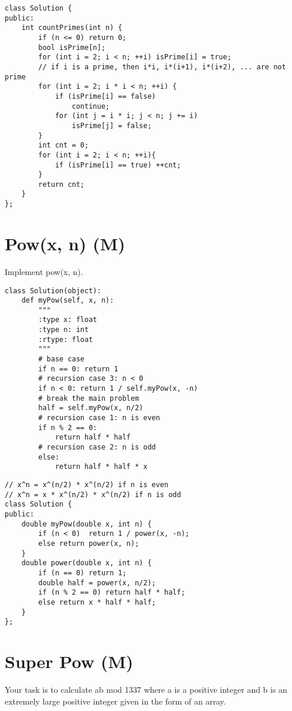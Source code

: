 \begin{lstlisting}
class Solution {
public:
    int countPrimes(int n) {
        if (n <= 0) return 0;
        bool isPrime[n];
        for (int i = 2; i < n; ++i) isPrime[i] = true;
        // if i is a prime, then i*i, i*(i+1), i*(i+2), ... are not prime
        for (int i = 2; i * i < n; ++i) {
            if (isPrime[i] == false)    
                continue;
            for (int j = i * i; j < n; j += i)  
                isPrime[j] = false;
        }
        int cnt = 0;
        for (int i = 2; i < n; ++i){
            if (isPrime[i] == true) ++cnt;
        }
        return cnt;
    }
};
\end{lstlisting}


\section{Pow(x, n) (M)}
Implement pow(x, n). \\

\begin{lstlisting}
class Solution(object):
    def myPow(self, x, n):
        """
        :type x: float
        :type n: int
        :rtype: float
        """
        # base case
        if n == 0: return 1
        # recursion case 3: n < 0
        if n < 0: return 1 / self.myPow(x, -n)   
        # break the main problem
        half = self.myPow(x, n/2)
        # recursion case 1: n is even
        if n % 2 == 0:
            return half * half
        # recursion case 2: n is odd
        else:
            return half * half * x
\end{lstlisting}

\begin{lstlisting}
// x^n = x^(n/2) * x^(n/2) if n is even
// x^n = x * x^(n/2) * x^(n/2) if n is odd
class Solution {
public:
    double myPow(double x, int n) {
        if (n < 0)  return 1 / power(x, -n);
        else return power(x, n);
    }
    double power(double x, int n) {
        if (n == 0) return 1;
        double half = power(x, n/2);
        if (n % 2 == 0) return half * half;
        else return x * half * half;
    }
};
\end{lstlisting}


\section{Super Pow (M)}
Your task is to calculate ab mod 1337 where a is a positive integer and b is an extremely large positive integer given in the form of an array. \\
 
